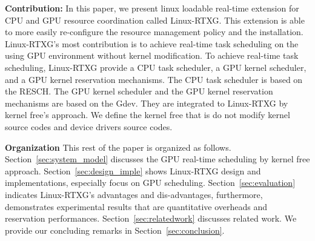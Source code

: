 \textbf{Contribution:}
In this paper, we present linux loadable real-time extension for CPU and GPU resource coordination called Linux-RTXG.
This extension is able to more easily re-configure the resource management policy and the installation.
Linux-RTXG's most contribution is to achieve real-time task scheduling on the using GPU environment without kernel modification.
To achieve real-time task scheduling, 
Linux-RTXG provide a CPU task scheduler, a GPU kernel scheduler, and a GPU kernel reservation mechanisms.
The CPU task scheduler is based on the RESCH.
The GPU kernel scheduler and the GPU kernel reservation mechanisms are based on the Gdev.
They are integrated to Linux-RTXG by kernel free's approach.
We define the kernel free that is do not modify kernel source codes and device drivers source codes.



\textbf{Organization}
This rest of the paper is organized as follows.
Section~\ref{sec:system_model} discusses the GPU real-time scheduling by kernel free approach.
Section~\ref{sec:design_imple} shows Linux-RTXG design and implementations, especially focus on GPU scheduling.
Section~\ref{sec:evaluation} indicates Linux-RTXG's advantages and dis-advantages,
furthermore, demonstrates experimental results that are quantitative overheads and reservation performances.
Section~\ref{sec:relatedwork} discusses related work.
We provide our concluding remarks in Section~\ref{sec:conclusion}.
